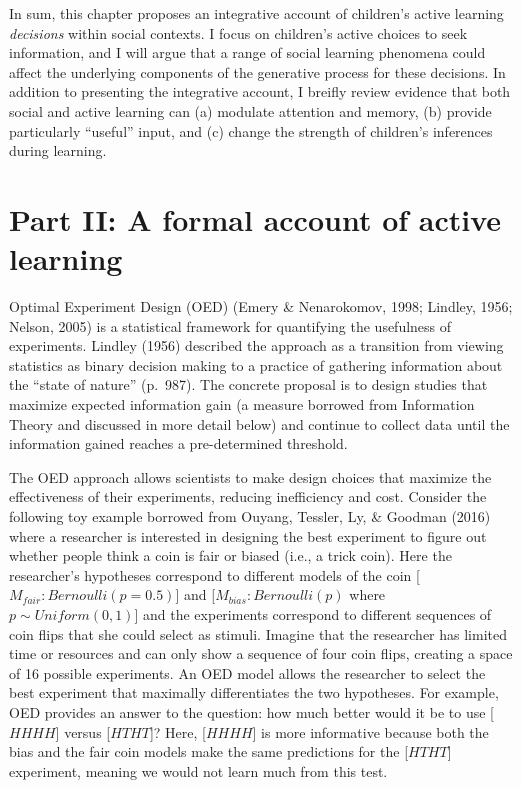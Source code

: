 \documentclass[oneside]{report}
\begin{document}
In sum, this chapter proposes an integrative account of children's
active learning \emph{decisions} within social contexts. I focus on
children's active choices to seek information, and I will argue that a
range of social learning phenomena could affect the underlying
components of the generative process for these decisions. In addition to
presenting the integrative account, I breifly review evidence that both
social and active learning can (a) modulate attention and memory, (b)
provide particularly ``useful'' input, and (c) change the strength of
children's inferences during learning.

\hypertarget{oed}{%
\section{Part II: A formal account of active learning}\label{oed}}

Optimal Experiment Design (OED) (Emery \& Nenarokomov, 1998; Lindley,
1956; Nelson, 2005) is a statistical framework for quantifying the
usefulness of experiments. Lindley (1956) described the approach as a
transition from viewing statistics as binary decision making to a
practice of gathering information about the ``state of nature''
(p.~987). The concrete proposal is to design studies that maximize
expected information gain (a measure borrowed from Information Theory
and discussed in more detail below) and continue to collect data until
the information gained reaches a pre-determined threshold.

The OED approach allows scientists to make design choices that maximize
the effectiveness of their experiments, reducing inefficiency and cost.
Consider the following toy example borrowed from Ouyang, Tessler, Ly, \&
Goodman (2016) where a researcher is interested in designing the best
experiment to figure out whether people think a coin is fair or biased
(i.e., a trick coin). Here the researcher's hypotheses correspond to
different models of the coin {[}\(M_{fair}: Bernoulli(p = 0.5)\){]} and
{[}\(M_{bias}: Bernoulli(p)\) where \(p \sim Uniform(0,1)\){]} and the
experiments correspond to different sequences of coin flips that she
could select as stimuli. Imagine that the researcher has limited time or
resources and can only show a sequence of four coin flips, creating a
space of 16 possible experiments. An OED model allows the researcher to
select the best experiment that maximally differentiates the two
hypotheses. For example, OED provides an answer to the question: how
much better would it be to use {[}\(HHHH\){]} versus {[}\(HTHT\){]}?
Here, {[}\(HHHH\){]} is more informative because both the bias and the
fair coin models make the same predictions for the {[}\(HTHT\){]}
experiment, meaning we would not learn much from this test.
\end{document}
